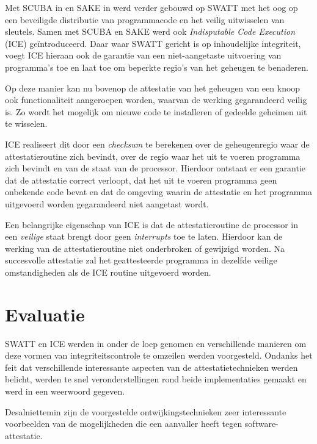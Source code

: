 Met SCUBA in \citep{seshadri2006scuba} en SAKE in \citep{seshadri2008sake} werd
verder gebouwd op SWATT met het oog op een beveiligde distributie van
programmacode en het veilig uitwisselen van sleutels. Samen met SCUBA en SAKE
werd ook \emph{Indisputable Code Execution} (ICE) ge\"introduceerd. Daar waar
SWATT gericht is op inhoudelijke integriteit, voegt ICE hieraan ook de garantie
van een niet-aangetaste uitvoering van programma's toe en laat toe om beperkte
regio's van het geheugen te benaderen.

Op deze manier kan nu bovenop de attestatie van het geheugen van een knoop ook
functionaliteit aangeroepen worden, waarvan de werking gegarandeerd veilig is.
Zo wordt het mogelijk om nieuwe code te installeren of gedeelde geheimen uit te
wisselen.

ICE realiseert dit door een \emph{checksum} te berekenen over de geheugenregio
waar de attestatieroutine zich bevindt, over de regio waar het uit te voeren
programma zich bevindt en van de staat van de processor. Hierdoor ontstaat er
een garantie dat de attestatie correct verloopt, dat het uit te voeren
programma geen onbekende code bevat en dat de omgeving waarin de attestatie en
het programma uitgevoerd worden gegarandeerd niet aangetast wordt.

Een belangrijke eigenschap van ICE is dat de attestatieroutine de processor in
een \emph{veilige} staat brengt door geen \emph{interrupts} toe te laten.
Hierdoor kan de werking van de attestatieroutine niet onderbroken of gewijzigd
worden. Na succesvolle attestatie zal het geattesteerde programma in dezelfde
veilige omstandigheden als de ICE routine uitgevoerd worden.

\section{Evaluatie}

SWATT en ICE werden in \citep{castelluccia2009difficulty} onder de loep genomen
en verschillende manieren om deze vormen van integriteitscontrole te omzeilen
werden voorgesteld. Ondanks het feit dat verschillende interessante aspecten
van de attestatietechnieken werden belicht, werden te snel veronderstellingen
rond beide implementaties gemaakt en werd in \citep{perrig2010refutation} een
weerwoord gegeven.

Desalniettemin zijn de voorgestelde ontwijkingstechnieken zeer interessante
voorbeelden van de mogelijkheden die een aanvaller heeft tegen
software-attestatie.

